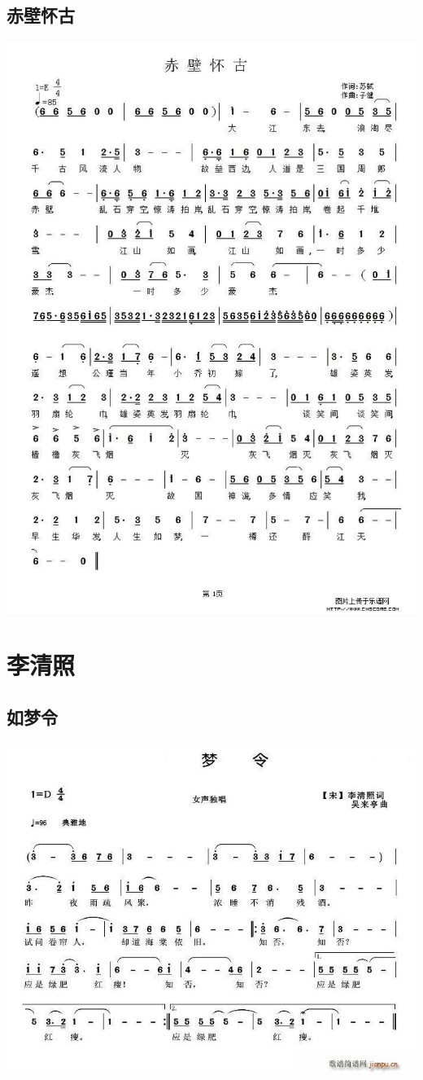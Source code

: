 \documentclass[cn,pad,twocol]{elegantbook}
\begin{document}
\section{赤壁怀古}
    \includegraphics[width=\textwidth]{rpi400/20201230赤壁怀古.jpg}

\chapter{李清照}
\section{如梦令}
    \includegraphics[width=\textwidth]{dongxiao/20200808-如梦令-李清照.jpg}
\end{document}
